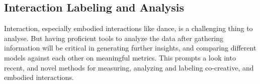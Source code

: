 \documentclass[final,5p,times,twocolumn,authoryear]{article}
\begin{document}

\subsection{Interaction Labeling and Analysis}
Interaction, especially embodied interactions like dance, is a
challenging thing to analyse. But having proficient tools to analyze the
data after gathering information will be critical in generating further
insights, and comparing different models against each other on
meaningful metrics. This prompts a look into recent, and novel methods
for measuring, analyzing and labeling co-creative, and embodied interactions.


\end{document}

